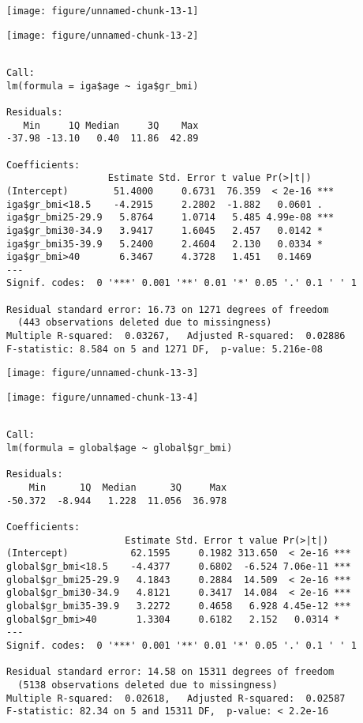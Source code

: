 \documentclass[11pt,a4paper]{article}\usepackage[]{graphicx}\usepackage[]{color}
\makeatletter
\def\maxwidth{ %
  \ifdim\Gin@nat@width>\linewidth
    \linewidth
  \else
    \Gin@nat@width
  \fi
}
\newenvironment{kframe}{%
 \def\at@end@of@kframe{}%
 \ifinner\ifhmode%
  \def\at@end@of@kframe{\end{minipage}}%
  \begin{minipage}{\columnwidth}%
 \fi\fi%
 \def\FrameCommand##1{\hskip\@totalleftmargin \hskip-\fboxsep
 \colorbox{shadecolor}{##1}\hskip-\fboxsep
     \hskip-\linewidth \hskip-\@totalleftmargin \hskip\columnwidth}%
 \MakeFramed {\advance\hsize-\width
   \@totalleftmargin\z@ \linewidth\hsize
   \@setminipage}}%
 {\par\unskip\endMakeFramed%
 \at@end@of@kframe}
\newenvironment{knitrout}{}{} %
\makeatother
\begin{document}
\begin{knitrout}
\color{fgcolor}
\texttt{[image: figure/unnamed-chunk-13-1]} 

\texttt{[image: figure/unnamed-chunk-13-2]} 
\begin{kframe}\begin{verbatim}

Call:
lm(formula = iga$age ~ iga$gr_bmi)

Residuals:
   Min     1Q Median     3Q    Max 
-37.98 -13.10   0.40  11.86  42.89 

Coefficients:
                  Estimate Std. Error t value Pr(>|t|)    
(Intercept)        51.4000     0.6731  76.359  < 2e-16 ***
iga$gr_bmi<18.5    -4.2915     2.2802  -1.882   0.0601 .  
iga$gr_bmi25-29.9   5.8764     1.0714   5.485 4.99e-08 ***
iga$gr_bmi30-34.9   3.9417     1.6045   2.457   0.0142 *  
iga$gr_bmi35-39.9   5.2400     2.4604   2.130   0.0334 *  
iga$gr_bmi>40       6.3467     4.3728   1.451   0.1469    
---
Signif. codes:  0 '***' 0.001 '**' 0.01 '*' 0.05 '.' 0.1 ' ' 1

Residual standard error: 16.73 on 1271 degrees of freedom
  (443 observations deleted due to missingness)
Multiple R-squared:  0.03267,	Adjusted R-squared:  0.02886 
F-statistic: 8.584 on 5 and 1271 DF,  p-value: 5.216e-08
\end{verbatim}
\end{kframe}
\texttt{[image: figure/unnamed-chunk-13-3]} 

\texttt{[image: figure/unnamed-chunk-13-4]} 
\begin{kframe}\begin{verbatim}

Call:
lm(formula = global$age ~ global$gr_bmi)

Residuals:
    Min      1Q  Median      3Q     Max 
-50.372  -8.944   1.228  11.056  36.978 

Coefficients:
                     Estimate Std. Error t value Pr(>|t|)    
(Intercept)           62.1595     0.1982 313.650  < 2e-16 ***
global$gr_bmi<18.5    -4.4377     0.6802  -6.524 7.06e-11 ***
global$gr_bmi25-29.9   4.1843     0.2884  14.509  < 2e-16 ***
global$gr_bmi30-34.9   4.8121     0.3417  14.084  < 2e-16 ***
global$gr_bmi35-39.9   3.2272     0.4658   6.928 4.45e-12 ***
global$gr_bmi>40       1.3304     0.6182   2.152   0.0314 *  
---
Signif. codes:  0 '***' 0.001 '**' 0.01 '*' 0.05 '.' 0.1 ' ' 1

Residual standard error: 14.58 on 15311 degrees of freedom
  (5138 observations deleted due to missingness)
Multiple R-squared:  0.02618,	Adjusted R-squared:  0.02587 
F-statistic: 82.34 on 5 and 15311 DF,  p-value: < 2.2e-16
\end{verbatim}
\end{kframe}
\end{knitrout}
\end{document}
